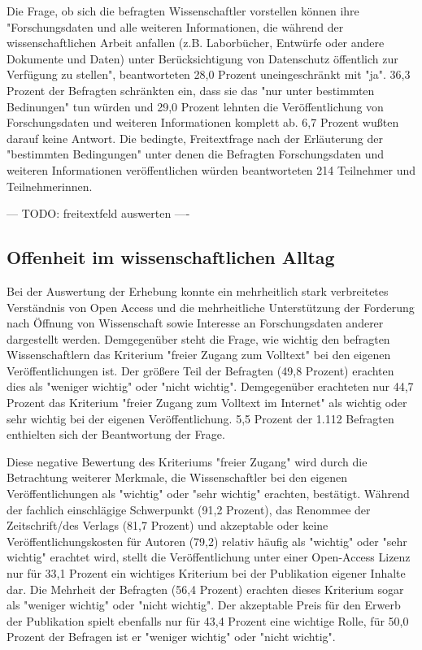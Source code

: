 Die Frage, ob sich die befragten Wissenschaftler vorstellen können ihre "Forschungsdaten und alle weiteren Informationen, die während der wissenschaftlichen Arbeit anfallen (z.B. Laborbücher, Entwürfe oder andere Dokumente und Daten) unter Berücksichtigung von Datenschutz öffentlich zur Verfügung zu stellen", beantworteten 28,0 Prozent uneingeschränkt mit "ja". 36,3 Prozent der Befragten schränkten ein, dass sie das "nur unter bestimmten Bedinungen" tun würden und 29,0 Prozent lehnten die Veröffentlichung von Forschungsdaten und weiteren Informationen komplett ab. 6,7 Prozent wußten darauf keine Antwort. Die bedingte, Freitextfrage nach der Erläuterung der "bestimmten Bedingungen" unter denen die Befragten Forschungsdaten und weiteren Informationen veröffentlichen würden beantworteten 214 Teilnehmer und Teilnehmerinnen.

--- TODO: freitextfeld auswerten ----

\subsection{Offenheit im wissenschaftlichen Alltag}

Bei der Auswertung der Erhebung konnte ein mehrheitlich stark verbreitetes Verständnis von Open Access und die mehrheitliche Unterstützung der Forderung nach Öffnung von Wissenschaft sowie Interesse an Forschungsdaten anderer dargestellt werden. Demgegenüber steht die Frage, wie wichtig den befragten Wissenschaftlern das Kriterium "freier Zugang zum Volltext" bei den eigenen Veröffentlichungen ist. Der größere Teil der Befragten (49,8 Prozent) erachten dies als "weniger wichtig" oder "nicht wichtig". Demgegenüber erachteten nur 44,7 Prozent das Kriterium "freier Zugang zum Volltext im Internet" als wichtig oder sehr wichtig bei der eigenen Veröffentlichung. 5,5 Prozent der 1.112 Befragten enthielten sich der Beantwortung der Frage.

Diese negative Bewertung des Kriteriums "freier Zugang" wird durch die Betrachtung weiterer Merkmale, die Wissenschaftler bei den eigenen Veröffentlichungen als "wichtig" oder "sehr wichtig" erachten, bestätigt. Während der fachlich einschlägige Schwerpunkt (91,2 Prozent), das Renommee der Zeitschrift/des Verlags (81,7 Prozent) und akzeptable oder keine Veröffentlichungskosten für Autoren (79,2) relativ häufig als "wichtig" oder "sehr wichtig" erachtet wird, stellt die Veröffentlichung unter einer Open-Access Lizenz nur für 33,1 Prozent ein wichtiges Kriterium bei der Publikation eigener Inhalte dar. Die Mehrheit der Befragten (56,4 Prozent) erachten dieses Kriterium sogar als "weniger wichtig" oder "nicht wichtig". Der akzeptable Preis für den Erwerb der Publikation spielt ebenfalls nur für 43,4 Prozent eine wichtige Rolle, für 50,0 Prozent der Befragen ist er "weniger wichtig" oder "nicht wichtig".

